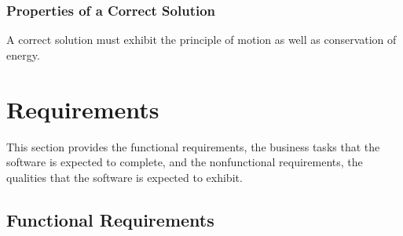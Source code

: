 \documentclass[12pt]{article}
\begin{document}
\subsubsection{Properties of a Correct Solution} \label{sec_CorrectSolution}

\noindent
A correct solution must exhibit the principle of motion as well as conservation of energy.

\section{Requirements}

This section provides the functional requirements, the business tasks that the
software is expected to complete, and the nonfunctional requirements, the
qualities that the software is expected to exhibit.

\subsection{Functional Requirements}
\end{document}
